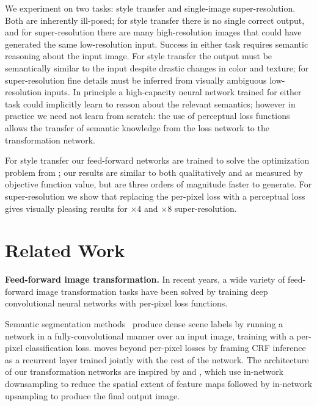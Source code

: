 \documentclass[runningheads]{llncs}
\begin{document}
We experiment on two tasks: style transfer and single-image super-resolution. Both are inherently
ill-posed; for style transfer there is no single correct output, and for super-resolution
there are many high-resolution images that could have generated the same low-resolution input.
Success in either task requires semantic reasoning about the input image. For style
transfer the output must be semantically similar to the input despite drastic changes in color
and texture; for super-resolution fine details must be inferred from visually ambiguous low-resolution
inputs. In principle a high-capacity neural network trained for either task could implicitly learn
to reason about the relevant semantics; however in practice we need not learn from scratch: the
use of perceptual loss functions allows the transfer of semantic knowledge from the loss network to
the transformation network.

For style transfer our feed-forward networks are trained to solve the optimization problem from
\cite{gatys2015neural}; our results are similar to \cite{gatys2015neural} both qualitatively and as
measured by objective function value, but are three orders
of magnitude faster to generate. For super-resolution we show that replacing the
per-pixel loss with a perceptual loss gives visually pleasing results for $\times4$ and $\times8$
super-resolution.



















\section{Related Work}
\textbf{Feed-forward image transformation.}
In recent years, a wide variety of feed-forward image transformation tasks have been solved
by training deep convolutional neural networks with per-pixel loss functions.

Semantic segmentation methods~\cite{long_shelhamer_fcn,eigen2015predicting,farabet2013learning,pinheiro2013recurrent,noh2015learning,zheng2015conditional}
produce dense scene labels by running a network in a fully-convolutional manner over an input
image, training with a per-pixel classification loss. \cite{zheng2015conditional}
moves beyond per-pixel losses by framing CRF inference as a recurrent layer trained jointly with
the rest of the network. The architecture of our transformation networks are inspired by
\cite{long_shelhamer_fcn} and \cite{noh2015learning}, which use in-network downsampling to reduce
the spatial extent of feature maps followed by in-network upsampling to produce the final
output image.
\end{document}
